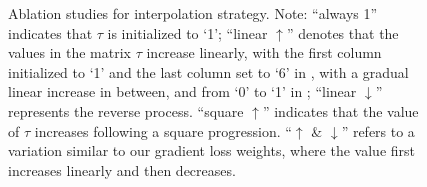\begin{figure}[htbp]
    \centering
    \hfill
    \caption{Ablation studies for interpolation strategy. Note: ``always 1'' indicates that $\tau$ is initialized to `1'; ``linear $\uparrow$'' denotes that the values in the matrix $\tau$ increase linearly, with the first column initialized to `1' and the last column set to `6' in , with a gradual linear increase in between, and from `0' to `1' in ; ``linear $\downarrow$'' represents the reverse process. ``square $\uparrow$'' indicates that the value of $\tau$ increases following a square progression. ``$\uparrow$ \& $\downarrow$'' refers to a variation similar to our gradient loss weights, where the value first increases linearly and then decreases. }
    \label{fig:inxx3}
\end{figure}